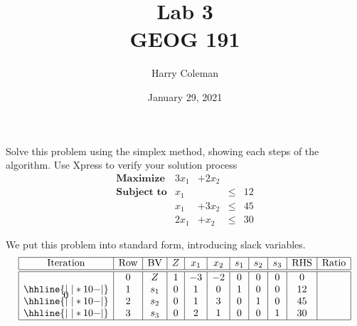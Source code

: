 \documentclass[12pt]{article}
\title{Lab 3\\
    \large GEOG 191
}
\author{Harry Coleman}
\date{January 29, 2021}
\newenvironment{problem}
    {\begin{lrbox}{\mybox}\begin{minipage}{0.98\textwidth}}
    {\end{minipage}\end{lrbox}\begin{center}\framebox[\textwidth]{\usebox{\mybox}}\end{center}}
\theoremstyle{definition}
\begin{document}
\maketitle

\section{}
\begin{problem}
    Solve this problem using the simplex method, showing each steps of the algorithm. Use Xpress to verify your solution process
    \[\begin{array}{lrrcr}
        \textbf{Maximize}   & 3x_1  & +2x_2 \\
        \textbf{Subject to} & x_1   &       &\leq& 12 \\
                            & x_1   & +3x_2 &\leq& 45 \\
                            & 2x_1  & +x_2  &\leq& 30
    \end{array}\]
\end{problem}

We put this problem into standard form, introducing slack variables.
\[\begin{array}{*{11}{|c}|}
    \hline
    \text{Iteration} & \text{Row} & \text{BV} & Z & x_1 & x_2 & s_1 & s_2 & s_3 & \text{RHS} & \text{Ratio} \\\hline\hline
    \multirow{4}*{0}
    & 0 & Z   & 1 & -3 & -2 & 0 & 0 & 0 & 0  & \\\hhline{|~|*{10}{-}|}
    & 1 & s_1 & 0 & 1  & 0  & 1 & 0 & 0 & 12 & \\\hhline{|~|*{10}{-}|}
    & 2 & s_2 & 0 & 1  & 3  & 0 & 1 & 0 & 45 & \\\hhline{|~|*{10}{-}|}
    & 3 & s_3 & 0 & 2  & 1  & 0 & 0 & 1 & 30 & \\\hline
\end{array}\]
\end{document}
